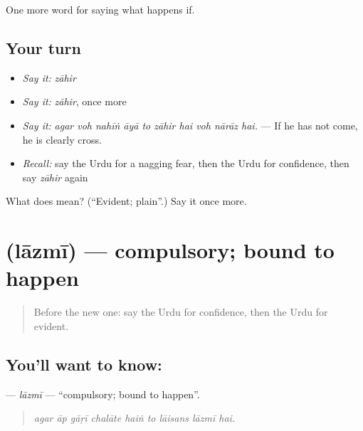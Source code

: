 \begin{grammarlens}[title={What you've built}]
One more word for saying what happens if.
\end{grammarlens}

\subsection*{Your turn}
\begin{itemize}
\raggedright
  \item \emph{Say it:} \emph{zāhir}
  \item \emph{Say it:} \emph{zāhir}, once more
  \item \emph{Say it:} \emph{agar voh nahīṅ āyā to zāhir hai voh nārāz hai.} — If he has not come, he is clearly cross.
  \item \emph{Recall:} say the Urdu for a nagging fear, then the Urdu for confidence, then say \emph{zāhir} again
\end{itemize}

\begin{tcolorbox}[breakable,colback=teal!4,colframe=teal!35!black,title={Before you move on}]
What does  mean? (\textquotedblleft{}Evident; plain\textquotedblright{}.) Say it once more.
\end{tcolorbox}
\section[\texorpdfstring{\ur{لازمی} (lāzmī)}{لازمی (lāzmī)}]{ (lāzmī) — compulsory; bound to happen}

\label{lesson:UR-C364-lazmi}



\begin{quote}
Before the new one: say the Urdu for confidence, then the Urdu for evident.
\end{quote}

\subsection*{You'll want to know: }
\textbf{} — \emph{lāzmī} — \textquotedblleft{}compulsory; bound to happen\textquotedblright{}.

\begin{quote}
        
\end{quote}

\begin{quote}
\emph{agar āp gāṛī chalāte haiṅ to lāisans lāzmī hai.}
\end{quote}

